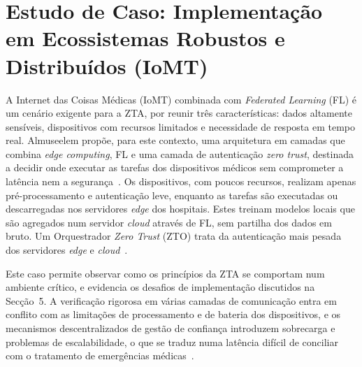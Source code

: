 \documentclass{llncs}
\begin{document}
\section{Estudo de Caso: Implementação em Ecossistemas Robustos e Distribuídos (IoMT)}
A Internet das Coisas Médicas (IoMT) combinada com \textit{Federated Learning} (FL)
é um cenário exigente para a ZTA, por reunir três características: dados altamente
sensíveis, dispositivos com recursos limitados e necessidade de resposta em tempo
real. Almuseelem propõe, para este contexto, uma arquitetura em camadas que combina
\textit{edge computing}, FL e uma camada de autenticação \textit{zero trust},
destinada a decidir onde executar as tarefas dos dispositivos médicos sem
comprometer a latência nem a segurança~\cite{secure_latency}. Os dispositivos, com
poucos recursos, realizam apenas pré-processamento e autenticação leve, enquanto
as tarefas são executadas ou descarregadas nos servidores \textit{edge} dos
hospitais. Estes treinam modelos locais que são agregados num servidor
\textit{cloud} através de FL, sem partilha dos dados em bruto. Um Orquestrador
\textit{Zero Trust} (ZTO) trata da autenticação mais pesada dos servidores
\textit{edge} e \textit{cloud}~\cite{secure_latency}.

Este caso permite observar como os princípios da ZTA se comportam num ambiente
crítico, e evidencia os desafios de implementação discutidos na Secção~5. A
verificação rigorosa em várias camadas de comunicação entra em conflito com as
limitações de processamento e de bateria dos dispositivos, e os mecanismos
descentralizados de gestão de confiança introduzem sobrecarga e problemas de
escalabilidade, o que se traduz numa latência difícil de conciliar com o
tratamento de emergências médicas~\cite{secure_latency}.
\end{document}
